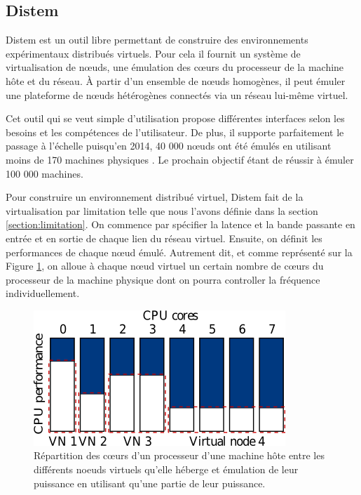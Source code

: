 \subsection{Distem}
\label{subsection:Distem}

Distem \citep{DISTEM} est un outil libre permettant de construire des
environnements expérimentaux distribués virtuels. Pour cela il fournit un
système de virtualisation de n\oe uds, une émulation des c\oe urs du processeur
de la machine hôte et du réseau. À partir d'un ensemble de n\oe uds homogènes,
il peut émuler une plateforme de n\oe uds hétérogènes connectés via un réseau
lui-même virtuel.

Cet outil qui se veut simple d'utilisation propose différentes interfaces selon
les besoins et les compétences de l'utilisateur. De plus, il supporte
parfaitement le passage à l'échelle puisqu'en 2014, 40 000 n\oe uds ont été
émulés en utilisant moins de 170 machines physiques
\citep{DISTEM_buchert2014emulation}. Le prochain objectif étant de réussir à
émuler 100 000 machines.

Pour construire un environnement distribué virtuel, Distem fait de la
virtualisation par limitation telle que nous l'avons définie dans la section
\ref{section:limitation}. On commence par spécifier la latence et la bande
passante en entrée et en sortie de chaque lien du réseau virtuel. Ensuite, on
définit les performances de chaque n\oe ud émulé. Autrement dit, et comme
représenté sur la Figure \ref{Distem_core}, on alloue à chaque n\oe ud virtuel
un certain nombre de c\oe urs du processeur de la machine physique dont on
pourra controller la fréquence individuellement.

\begin{figure}[H]
  \centering
  \includegraphics[scale=0.70]{Pictures/png/Distem_repartion_coeurs_v1}
  \caption{Répartition des c\oe urs d'un processeur d'une machine hôte entre les différents noeuds virtuels qu'elle héberge et émulation de leur puissance en utilisant qu'une partie de leur puissance.}
  \label{Distem_core}
\end{figure}
  
